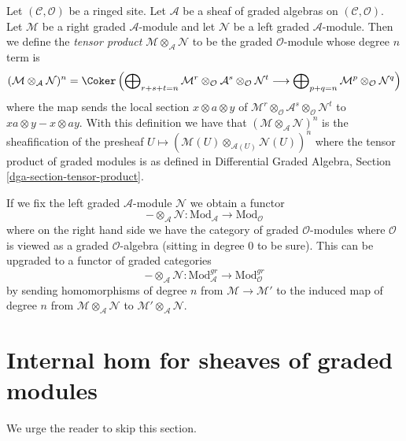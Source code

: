 \medskip\noindent
Let $(\mathcal{C}, \mathcal{O})$ be a ringed site. Let $\mathcal{A}$
be a sheaf of graded algebras on $(\mathcal{C}, \mathcal{O})$.
Let $\mathcal{M}$ be a right graded $\mathcal{A}$-module
and let $\mathcal{N}$ be a left graded $\mathcal{A}$-module.
Then we define the {\it tensor product}
$\mathcal{M} \otimes_\mathcal{A} \mathcal{N}$
to be the graded $\mathcal{O}$-module whose degree $n$ term is
$$
(\mathcal{M} \otimes_\mathcal{A} \mathcal{N})^n =
\Coker\left(
\bigoplus\nolimits_{r + s + t = n} \mathcal{M}^r \otimes_\mathcal{O}
\mathcal{A}^s \otimes_\mathcal{O} \mathcal{N}^t
\longrightarrow
\bigoplus\nolimits_{p + q = n} \mathcal{M}^p \otimes_\mathcal{O} \mathcal{N}^q
\right)
$$
where the map sends the local section $x \otimes a \otimes y$
of $\mathcal{M}^r \otimes_\mathcal{O} \mathcal{A}^s
\otimes_\mathcal{O} \mathcal{N}^t$ to
$xa \otimes y - x \otimes ay$.
With this definition we have that
$(\mathcal{M} \otimes_\mathcal{A} \mathcal{N})^n$
is the sheafification of the presheaf
$U \mapsto (\mathcal{M}(U) \otimes_{\mathcal{A}(U)} \mathcal{N}(U))^n$
where the tensor product of graded modules is as defined in
Differential Graded Algebra, Section \ref{dga-section-tensor-product}.

\medskip\noindent
If we fix the left graded $\mathcal{A}$-module $\mathcal{N}$
we obtain a functor
$$
- \otimes_\mathcal{A} \mathcal{N} :
\text{Mod}_\mathcal{A}
\longrightarrow
\text{Mod}_\mathcal{O}
$$
where on the right hand side we have the category of graded
$\mathcal{O}$-modules where $\mathcal{O}$ is viewed as a
graded $\mathcal{O}$-algebra (sitting in degree $0$ to be sure).
This can be upgraded to a functor of graded categories
$$
- \otimes_\mathcal{A} \mathcal{N} :
\text{Mod}^{gr}_\mathcal{A}
\longrightarrow
\text{Mod}^{gr}_\mathcal{O}
$$
by sending homomorphisms of degree $n$ from $\mathcal{M} \to \mathcal{M}'$
to the induced map of degree $n$ from
$\mathcal{M} \otimes_\mathcal{A} \mathcal{N}$ to
$\mathcal{M}' \otimes_\mathcal{A} \mathcal{N}$.






\section{Internal hom for sheaves of graded modules}
\label{section-internal-hom-graded}

\noindent
We urge the reader to skip this section.

